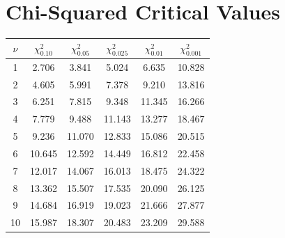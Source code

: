 \documentclass[12pt, a4paper, oneside]{book}
\theoremstyle{definition}
\theoremstyle{plain}
\theoremstyle{remark}
\begin{document}
\section{Chi-Squared Critical Values}

\begin{center}
\begin{tabular}{cccccc}
\toprule
$\nu$ & $\chi^2_{0.10}$ & $\chi^2_{0.05}$ & $\chi^2_{0.025}$ & $\chi^2_{0.01}$ & $\chi^2_{0.001}$ \\
\midrule
1  & 2.706 & 3.841  & 5.024  & 6.635  & 10.828 \\
2  & 4.605 & 5.991  & 7.378  & 9.210  & 13.816 \\
3  & 6.251 & 7.815  & 9.348  & 11.345 & 16.266 \\
4  & 7.779 & 9.488  & 11.143 & 13.277 & 18.467 \\
5  & 9.236 & 11.070 & 12.833 & 15.086 & 20.515 \\
6  & 10.645& 12.592 & 14.449 & 16.812 & 22.458 \\
7  & 12.017& 14.067 & 16.013 & 18.475 & 24.322 \\
8  & 13.362& 15.507 & 17.535 & 20.090 & 26.125 \\
9  & 14.684& 16.919 & 19.023 & 21.666 & 27.877 \\
10 & 15.987& 18.307 & 20.483 & 23.209 & 29.588 \\
\bottomrule
\end{tabular}
\end{center}

\printindex
\end{document}
